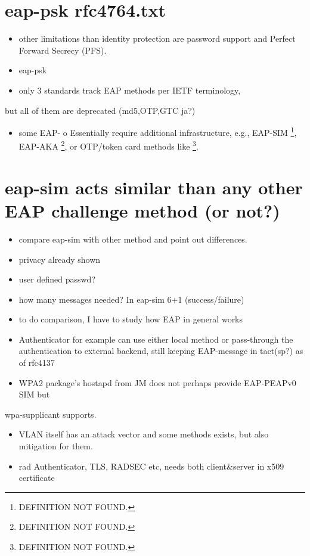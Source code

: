 \documentclass[12pt,a4paper,english]{tutthesis}
\begin{document}
\section{eap-psk rfc4764.txt}
\label{sec-8-4}
\begin{itemize}
\item other limitations than identity protection are password support and Perfect Forward Secrecy (PFS).
\item eap-psk
\item only 3 standards track EAP methods per IETF terminology,
\end{itemize}
but all of them are deprecated (md5,OTP,GTC ja?)
\begin{itemize}
\item some EAP- o  Essentially require additional infrastructure, e.g., EAP-SIM \footnote{DEFINITION NOT FOUND.},
EAP-AKA \footnote{DEFINITION NOT FOUND.}, or OTP/token card methods like \footnote{DEFINITION NOT FOUND.}.
\end{itemize}


\section{eap-sim acts similar than any other EAP challenge method (or not?)}
\label{sec-8-5}
\begin{itemize}
\item compare eap-sim with other method and point out differences.
\item privacy already shown
\item user defined passwd?
\item how many messages needed? In eap-sim 6+1 (success/failure)
\item to do comparison, I have to study how EAP in general works
\item Authenticator for example can use either local method or
pass-through the authentication to external backend, still keeping
EAP-message in tact(sp?) as of  rfc4137
\item WPA2 package's hostapd from JM does not perhaps provide EAP-PEAPv0 SIM but
\end{itemize}
wpa-supplicant supports.
\begin{itemize}
\item VLAN itself has an attack vector and some methods exists, but also
mitigation for them.
\item rad Authenticator, TLS, RADSEC etc, needs both client\&server in
x509 certificate
\end{itemize}
\end{document}
